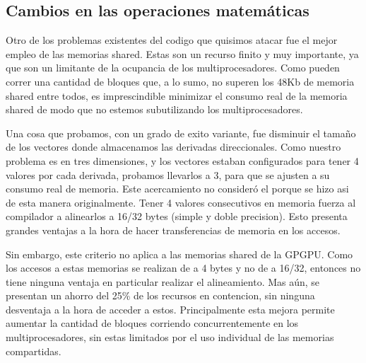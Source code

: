 \subsection{Cambios en las operaciones matem\'aticas}
Otro de los problemas existentes del codigo que quisimos atacar fue el mejor empleo de las
memorias shared. Estas son un recurso finito y muy importante, ya que son un limitante de 
la ocupancia de los multiprocesadores. Como pueden correr una cantidad de bloques que, a lo sumo, 
no superen los 48Kb de memoria shared entre todos, es imprescindible minimizar el consumo real
de la memoria shared de modo que no estemos subutilizando los multiprocesadores.

Una cosa que probamos, con un grado de exito variante, fue disminuir el tamaño de los vectores
donde almacenamos las derivadas direccionales. Como nuestro problema es en tres dimensiones,
y los vectores estaban configurados para tener 4 valores por cada derivada, probamos llevarlos a
3, para que se ajusten a su consumo real de memoria. Este acercamiento no consider\'o el porque
se hizo asi de esta manera originalmente. Tener 4 valores consecutivos en memoria fuerza
al compilador a alinearlos a 16/32 bytes (simple y doble precision). 
Esto presenta grandes ventajas a la hora de hacer transferencias de memoria en los accesos.

Sin embargo, este criterio no aplica a las memorias shared de la GPGPU. Como los accesos
a estas memorias se realizan de a 4 bytes y no de a 16/32, entonces no tiene ninguna ventaja
en particular realizar el alineamiento. Mas a\'un, se presentan un ahorro del 25\% de los
recursos en contencion, sin ninguna desventaja a la hora de acceder a estos. Principalmente
esta mejora permite aumentar la cantidad de bloques corriendo concurrentemente en los multiprocesadores,
sin estas limitados por el uso individual de las memorias compartidas.
